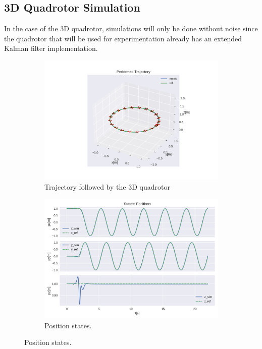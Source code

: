 \documentclass{thesisreport}
\begin{document}
\subsection{3D Quadrotor Simulation}

In the case of the 3D quadrotor, simulations will only be done without noise since the quadrotor that will be used for experimentation already has an extended Kalman filter implementation.

\newpage

\begin{figure}[H]
	\begin{subfigure}{0.45\textwidth}
		\includegraphics[width=\linewidth]{Images/acados_simulations/circular_trajectory/3D_quadrotor/sim3D.png}
		\caption{Trajectory followed by the 3D quadrotor} \label{fig:3D_sim_3d}
	\end{subfigure}\hspace*{\fill}
	\begin{subfigure}{0.45\textwidth}
		\includegraphics[width=\linewidth]{Images/acados_simulations/circular_trajectory/3D_quadrotor/posStates.png}
		\caption{Position states.} \label{fig:3D_sim_pose}
	\end{subfigure}


\end{figure}
\end{document}
